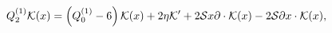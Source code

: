 \begin{equation}\label{eq:act}
Q_2^{(1)}{\cal K}(x)=\left(Q_{0}^{(1)}-6\right){\cal K}(x)+2\eta
{\cal K}'+2{\cal S} x\partial\cdot{\cal K}(x)-2{\cal S}  \partial
x\cdot{\cal K}(x),
\end{equation}

